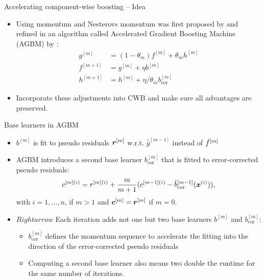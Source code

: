 \documentclass[10pt]{beamer}
\begin{document}
\begin{frame}{Accelerating component-wise boosting -- Idea}

  \begin{itemize}
    \item
      Using momentum and Nesterovs momentum was first proposed by \cite{biau2019accelerated} and refined in an algorithm called Accelerated Gradient Boosting Machine (AGBM) by \cite{lu2020accelerating}:
      \begin{align*}
      g^{[m]} &= (1 - \theta_m) f^{[m]} + \theta_m h^{[m]}\\
      f^{[m+1]} &= g^{[m]} + \eta b^{[m]} \\
      h^{[m+1]} &= h^{[m]} + \eta / \theta_m b^{[m]}_{\text{cor}}
      \end{align*}
    \item
      Incorporate these adjustments into CWB and make sure all advantages are preserved.
  \end{itemize}

\end{frame}

\begin{frame}{Base learners in AGBM}
  \begin{itemize}
    \item
      \(b^{[m]}\) is fit to pseudo residuals \(\bm{r}^{[m]}\) w.r.t.
      \(\hat{g}^{[m-1]}\) instead of \(\hat{f}^{[m]}\)

    \item
      AGBM introduces a second base learner $b^{[m]}_{\text{cor}}$ that is fitted to error-corrected pseudo residuals:
      \[c^{[m](i)} = r^{[m](i)} + \frac{m}{m+1}(c^{[m-1](i)} - \hat{b}_{\text{cor}}^{[m-1]}(\bm{x}^{(i)})),\]
      with \(i = 1, \dots, n\), if \(m > 1\) and \(\bm{c}^{[m]} = \bm{r}^{[m]}\) if
      \(m = 0\).

    \item[] $Rightarrow$ Each iteration adds not one but two base learners $b^{[m]}$ and $b^{[m]}_{\text{cor}}$:
      \begin{itemize}
        \item $b^{[m]}_{\text{cor}}$ defines the momentum sequence to accelerate the fitting into the direction of the error-corrected pseudo residuals
        \item Computing a second base learner also means two double the runtime for the same number of iterations.
      \end{itemize}
  \end{itemize}
\end{frame}
\end{document}
